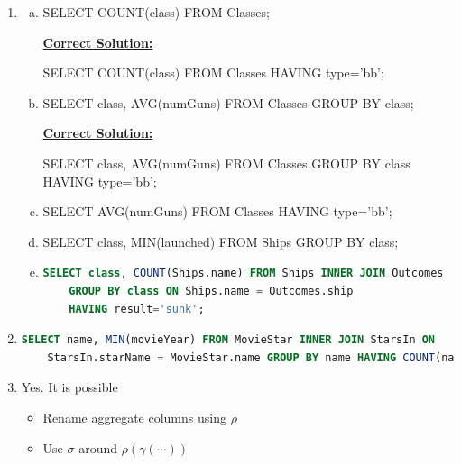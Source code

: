 \documentclass[12pt]{article}
\begin{document}
\begin{enumerate}[1.]
    \item

    \begin{enumerate}[a)]
        \item SELECT COUNT(class) FROM Classes;

        \begin{mdframed}
            \underline{\textbf{Correct Solution:}}

            \bigskip

            SELECT COUNT(class) FROM Classes \color{red}HAVING type='bb'\color{black};
        \end{mdframed}
        \item SELECT class, AVG(numGuns) FROM Classes GROUP BY class;

        \begin{mdframed}
            \underline{\textbf{Correct Solution:}}

            \bigskip

            SELECT class, AVG(numGuns) FROM Classes GROUP BY class \\
            \color{red}HAVING type='bb'\color{black};
        \end{mdframed}

        \item SELECT AVG(numGuns) FROM Classes HAVING type='bb';
        \item SELECT class, MIN(launched) FROM Ships GROUP BY class;
        \item

    \begin{lstlisting}[language=SQL]
    SELECT class, COUNT(Ships.name) FROM Ships INNER JOIN Outcomes
    GROUP BY class ON Ships.name = Outcomes.ship
    HAVING result='sunk';
    \end{lstlisting}
    \end{enumerate}

    \item

    \begin{lstlisting}[language=SQL]
    SELECT name, MIN(movieYear) FROM MovieStar INNER JOIN StarsIn ON
    StarsIn.starName = MovieStar.name GROUP BY name HAVING COUNT(name) >= 3;
    \end{lstlisting}

    \item

    Yes. It is possible

    \begin{itemize}
        \item Rename aggregate columns using $\rho$
        \item Use $\sigma$ around $\rho(\gamma(\cdots))$
    \end{itemize}


\end{enumerate}
\end{document}
